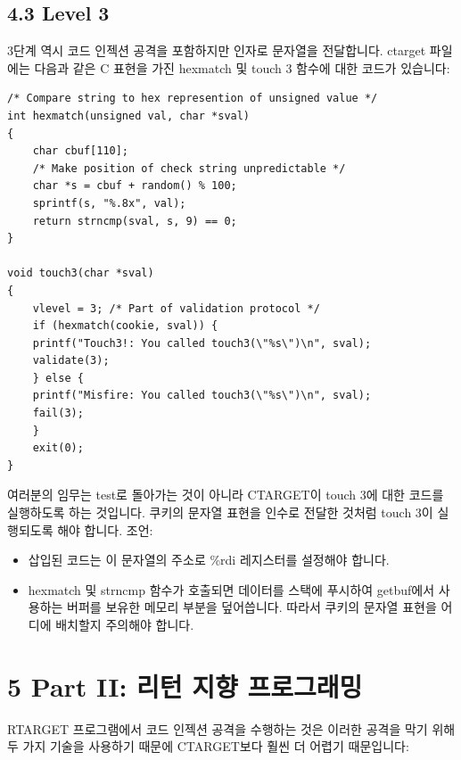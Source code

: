 \documentclass[10pt]{article}
\begin{document}
\subsection*{4.3 Level 3}
3단계 역시 코드 인젝션 공격을 포함하지만 인자로 문자열을 전달합니다.
\noindent
ctarget 파일에는 다음과 같은 C 표현을 가진 hexmatch 및 touch 3 함수에 대한 코드가 있습니다:

\begin{verbatim}
/* Compare string to hex represention of unsigned value */
int hexmatch(unsigned val, char *sval)
{
    char cbuf[110];
    /* Make position of check string unpredictable */
    char *s = cbuf + random() % 100;
    sprintf(s, "%.8x", val);
    return strncmp(sval, s, 9) == 0;
}

void touch3(char *sval)
{
    vlevel = 3; /* Part of validation protocol */
    if (hexmatch(cookie, sval)) {
    printf("Touch3!: You called touch3(\"%s\")\n", sval);
    validate(3);
    } else {
    printf("Misfire: You called touch3(\"%s\")\n", sval);
    fail(3);
    }
    exit(0);
}
\end{verbatim}
\noindent
여러분의 임무는 test로 돌아가는 것이 아니라 CTARGET이 touch 3에 대한 코드를 실행하도록 하는 것입니다. 쿠키의 문자열 표현을 인수로 전달한 것처럼 touch 3이 실행되도록 해야 합니다.
\noindent
조언:

\begin{itemize}
 문자열에 쿠키의 문자열 표현을 포함해야 합니다. 문자열은 선행 "0x"를 제외한 16진수 8자리(가장 중요한 숫자부터 가장 중요하지 않은 순서로 정렬)로 구성되어야 합니다.
   C에서 값이 0인 바이트가 뒤에 오는 바이트 시퀀스로 표현된다는 점을 기억하세요. 필요한 문자의 바이트 표현을 보려면 Linux 컴퓨터에서 "man ascii"를 입력합니다.
  \item 삽입된 코드는 이 문자열의 주소로 \%rdi 레지스터를 설정해야 합니다.
  \item hexmatch 및 strncmp 함수가 호출되면 데이터를 스택에 푸시하여 getbuf에서 사용하는 버퍼를 보유한 메모리 부분을 덮어씁니다. 따라서 쿠키의 문자열 표현을 어디에 배치할지 주의해야 합니다.
\end{itemize}

\section*{5 Part II: 리턴 지향 프로그래밍}
RTARGET 프로그램에서 코드 인젝션 공격을 수행하는 것은 이러한 공격을 막기 위해 두 가지 기술을 사용하기 때문에 CTARGET보다 훨씬 더 어렵기 때문입니다:
\end{document}
